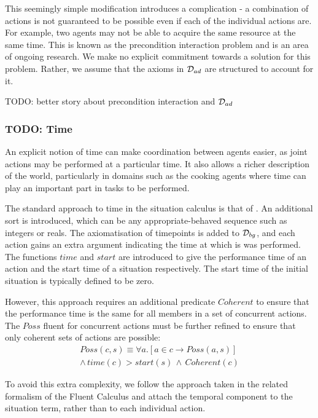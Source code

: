 This seemingly simple modification introduces a complication - a combination
of actions is not guaranteed to be possible even if each of the individual
actions are. For example, two agents may not be able to acquire the
same resource at the same time. This is known as the precondition
interaction problem \citep{pinto94temporal} and is an area of ongoing
research. We make no explicit commitment towards a solution for this
problem. Rather, we assume that the axioms in $\mathcal{D}_{ad}$ are structured
to account for it.

TODO: better story about precondition interaction and $\mathcal{D}_{ad}$


\subsubsection{TODO: Time}

An explicit notion of time can make coordination between agents easier,
as joint actions may be performed at a particular time. It also allows
a richer description of the world, particularly in domains such as
the cooking agents where time can play an important part in tasks
to be performed.

The standard approach to time in the situation calculus is that of
\citep{pinto94temporal,reiter96sc_nat_conc}. An additional sort 
is introduced, which can be any appropriate-behaved sequence such
as integers or reals. The axiomatisation of timepoints is added to
$\mathcal{D}_{bg}$, and each action gains an extra argument indicating the
time at which is was performed. The functions $time$ and $start$
are introduced to give the performance time of an action and the start
time of a situation respectively. The start time of the initial situation
is typically defined to be zero.

However, this approach requires an additional predicate $Coherent$
to ensure that the performance time is the same for all members in
a set of concurrent actions. The $Poss$ fluent for concurrent actions
must be further refined to ensure that only coherent sets of actions
are possible:\begin{multline*}
Poss(c,s)\equiv\forall a.\left[a\in c\rightarrow Poss(a,s)\right]\\
\wedge\, time(c)>start(s)\,\wedge\, Coherent(c)\end{multline*}


To avoid this extra complexity, we follow the approach taken in the
related formalism of the Fluent Calculus \citep{martin03conc_flux}
and attach the temporal component to the situation term, rather than
to each individual action.

